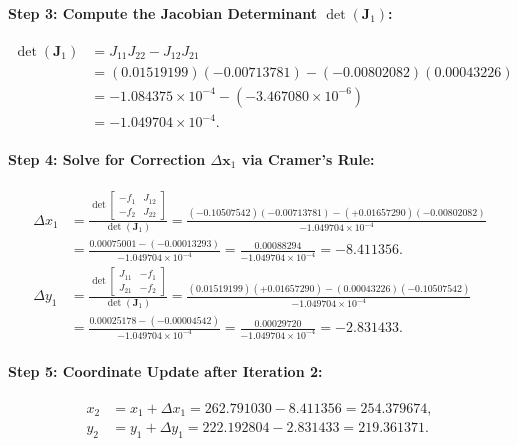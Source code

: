 \documentclass[11pt,a4paper]{article}
\begin{document}
\paragraph{Step 3: Compute the Jacobian Determinant $\det(\mathbf{J}_1)$:}
\begin{align*}
    \det(\mathbf{J}_1) &= J_{11} J_{22} - J_{12} J_{21} \\
    &= (0.01519199)(-0.00713781) - (-0.00802082)(0.00043226) \\
    &= -1.084375 \times 10^{-4} - (-3.467080 \times 10^{-6}) \\
    &= -1.049704 \times 10^{-4}.
\end{align*}

\paragraph{Step 4: Solve for Correction $\Delta \mathbf{x}_1$ via Cramer's Rule:}
\begin{align*}
    \Delta x_1 &= \frac{\det \begin{bmatrix} -f_1 & J_{12} \\ -f_2 & J_{22} \end{bmatrix}}{\det(\mathbf{J}_1)} 
    = \frac{(-0.10507542)(-0.00713781) - (+0.01657290)(-0.00802082)}{-1.049704 \times 10^{-4}} \\
    &= \frac{0.00075001 - (-0.00013293)}{-1.049704 \times 10^{-4}} = \frac{0.00088294}{-1.049704 \times 10^{-4}} = -8.411356. \\[1em]
    \Delta y_1 &= \frac{\det \begin{bmatrix} J_{11} & -f_1 \\ J_{21} & -f_2 \end{bmatrix}}{\det(\mathbf{J}_1)} 
    = \frac{(0.01519199)(+0.01657290) - (0.00043226)(-0.10507542)}{-1.049704 \times 10^{-4}} \\
    &= \frac{0.00025178 - (-0.00004542)}{-1.049704 \times 10^{-4}} = \frac{0.00029720}{-1.049704 \times 10^{-4}} = -2.831433.
\end{align*}

\paragraph{Step 5: Coordinate Update after Iteration 2:}
\begin{align*}
    x_2 &= x_1 + \Delta x_1 = 262.791030 - 8.411356 = 254.379674, \\
    y_2 &= y_1 + \Delta y_1 = 222.192804 - 2.831433 = 219.361371.
\end{align*}
\end{document}

